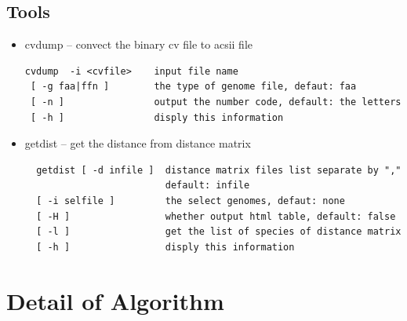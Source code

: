 \documentclass[a4paper,12pt]{article}
\begin{document}
\subsection{Tools}
\begin{itemize}
	\item cvdump -- convect the binary cv file to acsii file
	\begin{verbatim}
cvdump  -i <cvfile>    input file name
 [ -g faa|ffn ]        the type of genome file, defaut: faa
 [ -n ]                output the number code, default: the letters
 [ -h ]                disply this information
\end{verbatim}

	\item getdist -- get the distance from distance matrix
	\begin{verbatim}
  getdist [ -d infile ]  distance matrix files list separate by ","
                         default: infile
  [ -i selfile ]         the select genomes, defaut: none
  [ -H ]                 whether output html table, default: false
  [ -l ]                 get the list of species of distance matrix
  [ -h ]                 disply this information
\end{verbatim}
\end{itemize}

\section{Detail of Algorithm}
\end{document}
